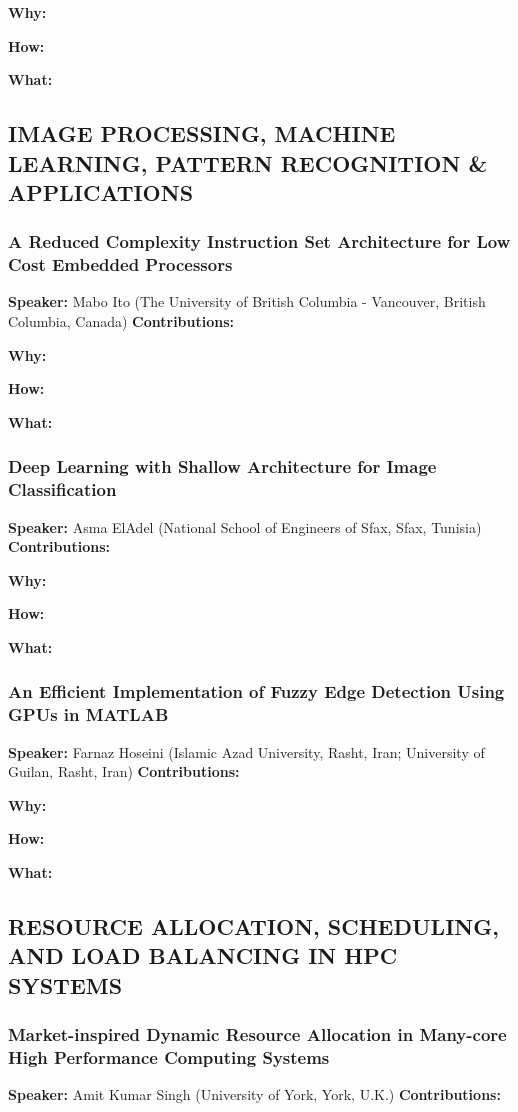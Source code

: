 \documentclass[twocolumn]{article}
\begin{document}
\noindent
\textbf{Why:}  

\noindent
\textbf{How:}  

\noindent
\textbf{What:}  

\subsection{IMAGE PROCESSING, MACHINE LEARNING, PATTERN RECOGNITION \& APPLICATIONS}
\subsubsection{A Reduced Complexity Instruction Set Architecture for Low Cost Embedded Processors}
\textbf{Speaker:} Mabo Ito (The University of British Columbia - Vancouver, British Columbia, Canada)
\noindent
\textbf{Contributions:}  

\noindent
\textbf{Why:}  

\noindent
\textbf{How:}  

\noindent
\textbf{What:}  

\subsubsection{Deep Learning with Shallow Architecture for Image Classification}
\textbf{Speaker:} Asma ElAdel (National School of Engineers of Sfax, Sfax, Tunisia)
\noindent
\textbf{Contributions:}  

\noindent
\textbf{Why:}  

\noindent
\textbf{How:}  

\noindent
\textbf{What:}  

\subsubsection{An Efficient Implementation of Fuzzy Edge Detection Using GPUs in MATLAB}
\textbf{Speaker:} Farnaz Hoseini (Islamic Azad University, Rasht, Iran; University of Guilan, Rasht, Iran)
\noindent
\textbf{Contributions:}  

\noindent
\textbf{Why:}  

\noindent
\textbf{How:}  

\noindent
\textbf{What:}  

\subsection{RESOURCE ALLOCATION, SCHEDULING, AND LOAD BALANCING IN HPC SYSTEMS}
\subsubsection{Market-inspired Dynamic Resource Allocation in Many-core High Performance Computing Systems}
\textbf{Speaker:} Amit Kumar Singh (University of York, York, U.K.)
\noindent
\textbf{Contributions:}  
\end{document}
